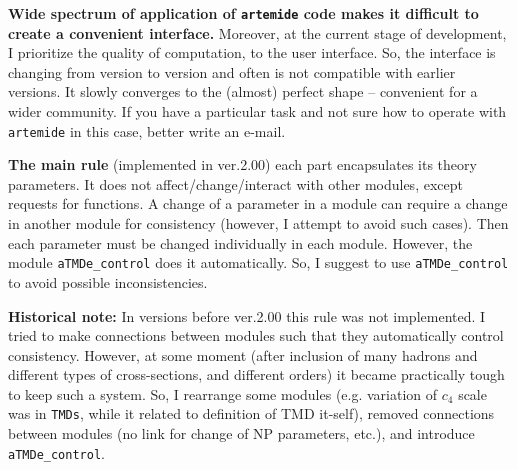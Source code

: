 \documentclass[prd,nofootinbib,eqsecnum,final]{revtex4}
\renewcommand{\(}{\left(}
\renewcommand{\)}{\right)}
\renewcommand{\[}{\left[}
\renewcommand{\]}{\right]}
\begin{document}
\textbf{Wide spectrum of application of \texttt{artemide} code makes it difficult to create a convenient interface.} Moreover, at the current stage of development, I prioritize the quality of computation, to the user interface. So, the interface is changing from version to version and often is not compatible with earlier versions. It slowly converges to the (almost) perfect shape -- convenient for a wider community. If you have a particular task and not sure how to operate with \texttt{artemide} in this case, better write an e-mail.

\begin{tcolorbox}
\textbf{The main rule} (implemented in ver.2.00) each part encapsulates its theory parameters. It does not affect/change/interact with other modules, except requests for functions. A change of a parameter in a module can require a change in another module for consistency (however, I attempt to avoid such cases). Then each parameter must be changed individually in each module. However, the module \texttt{aTMDe\_control} does it automatically. So, I suggest to use \texttt{aTMDe\_control} to avoid possible inconsistencies.
\end{tcolorbox}
\textbf{Historical note:} In versions before ver.2.00 this rule was not implemented. I tried to make connections between modules such that they automatically control consistency. However, at some moment (after inclusion of many hadrons and different types of cross-sections, and different orders) it became practically tough to keep such a system. So, I rearrange some modules (e.g. variation of $c_4$ scale was in \texttt{TMDs}, while it related to definition of TMD it-self), removed connections between modules (no link for change of NP parameters, etc.), and introduce \texttt{aTMDe\_control}.
\end{document}
